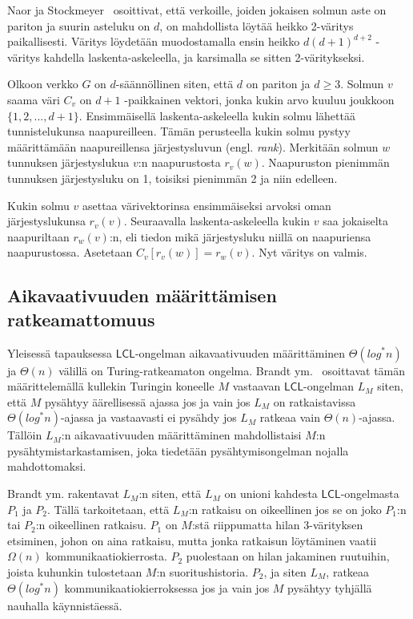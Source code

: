 \documentclass[12pt,finnish]{tktltiki2}
\theoremstyle{definition}
\theoremstyle{remark}
\newcommand*{\lcl}{\ensuremath{\mathsf{LCL}}}
\begin{document}
Naor ja Stockmeyer~\cite{naor95} osoittivat, että verkoille, joiden jokaisen solmun aste on pariton ja suurin asteluku on $d$, on mahdollista löytää heikko 2-väritys paikallisesti. Väritys löydetään muodostamalla ensin heikko $d(d + 1)^{d+2}$ -väritys kahdella laskenta-askeleella, ja karsimalla se sitten 2-väritykseksi.

Olkoon verkko $G$ on $d$-säännöllinen siten, että $d$ on pariton ja $d \geq 3$. Solmun $v$ saama väri $C_v$ on $d+1$ -paikkainen vektori, jonka kukin arvo kuuluu joukkoon $\{1, 2, ..., d+1\}$. Ensimmäisellä laskenta-askeleella kukin solmu lähettää tunnistelukunsa naapureilleen. Tämän perusteella kukin solmu pystyy määrittämään naapureillensa järjestysluvun (engl. \textit{rank}). Merkitään solmun $w$ tunnuksen järjestyslukua $v$:n naapurustosta $r_v(w)$. Naapuruston pienimmän tunnuksen järjestysluku on 1, toisiksi pienimmän 2 ja niin edelleen.

Kukin solmu $v$ asettaa värivektorinsa ensimmäiseksi arvoksi oman järjestyslukunsa $r_v(v)$. Seuraavalla laskenta-askeleella kukin $v$ saa jokaiselta naapuriltaan $r_w(v)$:n, eli tiedon mikä järjestysluku niillä on naapuriensa naapurustossa. Asetetaan $C_v[r_v(w)] = r_w(v)$. Nyt väritys on valmis.
\fi






\subsection{Aikavaativuuden määrittämisen ratkeamattomuus}
Yleisessä tapauksessa \lcl -ongelman aikavaativuuden määrittäminen $\Theta(log^* n)$ ja $\Theta(n)$ välillä on Turing-ratkeamaton ongelma. Brandt ym.~\cite{brandt} osoittavat tämän määrittelemällä kullekin Turingin koneelle $M$ vastaavan \lcl -ongelman $L_M$ siten, että $M$ pysähtyy äärellisessä ajassa jos ja vain jos $L_M$ on ratkaistavissa $\Theta(log^* n)$-ajassa ja vastaavasti ei pysähdy jos $L_M$ ratkeaa vain $\Theta(n)$-ajassa. Tällöin $L_M$:n aikavaativuuden määrittäminen mahdollistaisi $M$:n pysähtymistarkastamisen, joka tiedetään pysähtymisongelman nojalla mahdottomaksi.


Brandt ym. rakentavat $L_M$:n siten, että $L_M$ on unioni kahdesta \lcl -ongelmasta $P_1$ ja $P_2$. Tällä tarkoitetaan, että $L_M$:n ratkaisu on oikeellinen jos se on joko $P_1$:n tai $P_2$:n oikeellinen ratkaisu. $P_1$ on $M$:stä riippumatta hilan 3-värityksen etsiminen, johon on aina ratkaisu, mutta jonka ratkaisun löytäminen vaatii $\Omega(n)$ kommunikaatiokierrosta. $P_2$ puolestaan on hilan jakaminen ruutuihin, joista kuhunkin tulostetaan $M$:n suoritushistoria. $P_2$, ja siten $L_M$, ratkeaa $\Theta(log^* n)$ kommunikaatiokierroksessa jos ja vain jos $M$ pysähtyy tyhjällä nauhalla käynnistäessä.
\end{document}
